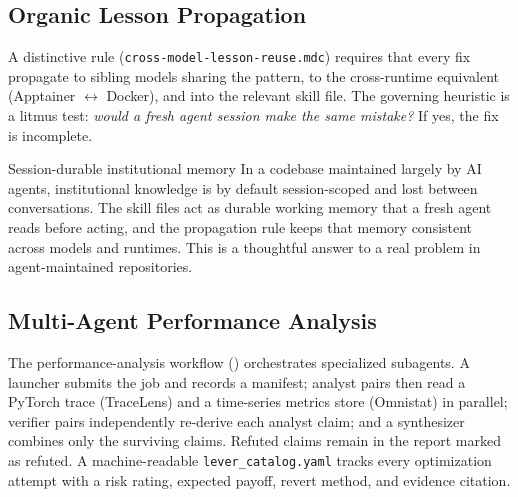 \documentclass[11pt]{article}
\newcommand{\file}[1]{\texttt{\small #1}}
\begin{document}
\subsection{Organic Lesson Propagation}
A distinctive rule (\file{cross-model-lesson-reuse.mdc}) requires that every fix
propagate to sibling models sharing the pattern, to the cross-runtime equivalent
(Apptainer $\leftrightarrow$ Docker), and into the relevant skill file. The
governing heuristic is a litmus test: \emph{would a fresh agent session make the
same mistake?} If yes, the fix is incomplete.

\begin{strength}{Session-durable institutional memory}
In a codebase maintained largely by AI agents, institutional knowledge is by default
session-scoped and lost between conversations. The skill files act as durable working
memory that a fresh agent reads before acting, and the propagation rule keeps that
memory consistent across models and runtimes. This is a thoughtful answer to a real
problem in agent-maintained repositories.
\end{strength}

\subsection{Multi-Agent Performance Analysis}
The performance-analysis workflow () orchestrates specialized
subagents. A launcher submits the job and records a manifest; analyst pairs then read
a PyTorch trace (TraceLens) and a time-series metrics store (Omnistat) in parallel;
verifier pairs independently re-derive each analyst claim; and a synthesizer combines
only the surviving claims. Refuted claims remain in the report marked as refuted. A
machine-readable \file{lever\_catalog.yaml} tracks every optimization attempt with a
risk rating, expected payoff, revert method, and evidence citation.
\end{document}
